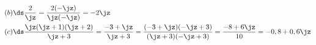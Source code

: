 \begin{align}
(b) & \ds \frac{2}{\jz} = \frac{2 (-\jz)}{\jz (-\jz)} = - 2 \jz
\\
(c) & \ds \frac{\jz (\jz+1) (\jz+2)}{\jz+3} = \frac{-3 + \jz}{\jz +3}
 = \frac{(-3+\jz)(-\jz+3)}{(\jz+3)(-\jz+3)} = \frac{-8+6\jz}{10} = -0,8
 + 0,6 \jz
\end{align}
